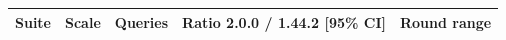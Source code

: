 \begin{tabular}{lllll}
\toprule
Suite & Scale & Queries & Ratio 2.0.0 / 1.44.2 [95\% CI] & Round range \\
\midrule
\bottomrule
\end{tabular}

